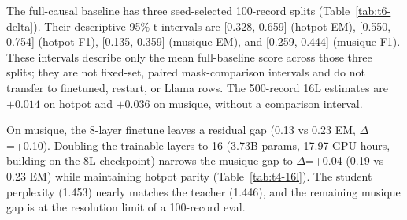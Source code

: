 The full-causal baseline has three seed-selected 100-record splits
(Table~\ref{tab:t6-delta}). Their descriptive 95\% t-intervals are
[0.328, 0.659] (hotpot EM), [0.550, 0.754] (hotpot F1), [0.135, 0.359]
(musique EM), and [0.259, 0.444] (musique F1). These intervals describe only
the mean full-baseline score across those three splits; they are not
fixed-set, paired mask-comparison intervals and do not transfer to finetuned,
restart, or Llama rows. The 500-record 16L estimates are $+0.014$ on hotpot
and $+0.036$ on musique, without a comparison interval.

\begin{table}[t]
\centering\small
\caption{T6 --- Qwen full-causal baseline on three seed-selected 100-record
    splits. The four 95\% t-intervals are descriptive intervals for the mean
    baseline score across these splits, not mask-comparison confidence
    intervals. $3\sigma$ spread is retained as a descriptive baseline
    summary.}
\label{tab:t6-delta}
\end{table}

\begin{table}[t]
\centering\small
\caption{T4 (16L) --- 16-layer-checkpoint finetune EM estimates on 100- and
    500-record evaluations. Each cell is a single-run estimate from one
    checkpoint lineage; no comparison confidence interval is available.}
\label{tab:t4-16l}
\end{table}

On musique, the 8-layer finetune leaves a residual gap (0.13 vs 0.23 EM,
$\Delta$=+0.10). Doubling the trainable layers to 16 (3.73B params,
17.97 GPU-hours, building on the 8L checkpoint) narrows the musique gap
to $\Delta$=+0.04 (0.19 vs 0.23 EM) while maintaining hotpot parity
(Table~\ref{tab:t4-16l}). The student perplexity (1.453) nearly matches
the teacher (1.446), and the remaining musique gap is at the resolution
limit of a 100-record eval.

\begin{table}[t]
\centering\small
\caption{T4 (16L) --- 8-layer vs 16-layer finetune comparison (EM), 100
    records per cell. Doubling capacity narrows the musique gap from
    +0.10 to +0.04 while preserving hotpot parity.}
\label{tab:t4-16l}
\end{table}

